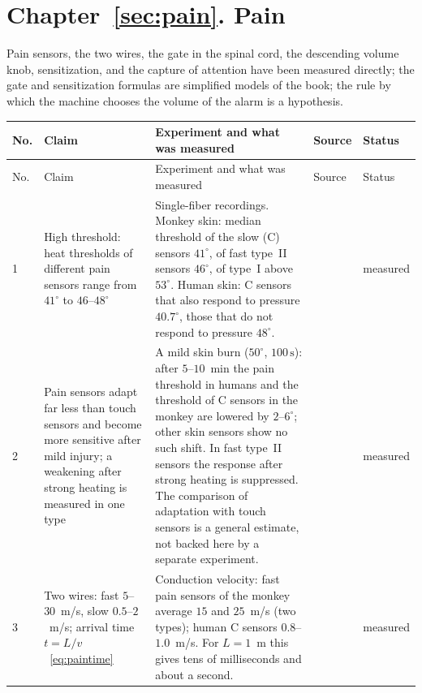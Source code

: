 \section{Chapter~\ref{sec:pain}. Pain}

Pain sensors, the two wires, the gate in the spinal cord, the descending volume knob, sensitization, and the capture of attention have been measured directly; the gate and sensitization formulas are simplified models of the book; the rule by which the machine chooses the volume of the alarm is a hypothesis.

{\footnotesize
\setlength{\tabcolsep}{3pt}\renewcommand{\arraystretch}{1.15}
\begin{longtable}{>{\raggedright}p{0.5cm}>{\raggedright}p{4.0cm}>{\raggedright}p{5.6cm}>{\raggedright}p{2.3cm}>{\raggedright\arraybackslash}p{1.7cm}}
\toprule
No. & Claim & Experiment and what was measured & Source & Status \\
\midrule\endfirsthead
\toprule
No. & Claim & Experiment and what was measured & Source & Status \\
\midrule\endhead
1 & High threshold: heat thresholds of different pain sensors range from $41^\circ$ to $46$--$48^\circ$ & Single-fiber recordings. Monkey skin: median threshold of the slow (C) sensors $41^\circ$, of fast type~II sensors $46^\circ$, of type~I above $53^\circ$. Human skin: C sensors that also respond to pressure $40.7^\circ$, those that do not respond to pressure $48^\circ$. & \cite{Treede1995heat, Weidner1999cfib} & measured \\
2 & Pain sensors adapt far less than touch sensors and become more sensitive after mild injury; a weakening after strong heating is measured in one type & A mild skin burn ($50^\circ$, $100\,\text{s}$): after $5$--$10$~min the pain threshold in humans and the threshold of C sensors in the monkey are lowered by $2$--$6^\circ$; other skin sensors show no such shift. In fast type~II sensors the response after strong heating is suppressed. The comparison of adaptation with touch sensors is a general estimate, not backed here by a separate experiment. & \cite{LaMotte1982hyper, Treede1995heat} & measured \\
3 & Two wires: fast $5$--$30$~m/s, slow $0.5$--$2$~m/s; arrival time $t=L/v$~\eqref{eq:paintime} & Conduction velocity: fast pain sensors of the monkey average $15$ and $25$~m/s (two types); human C sensors $0.8$--$1.0$~m/s. For $L=1$~m this gives tens of milliseconds and about a second. & \cite{Treede1995heat, Weidner1999cfib} & measured \\

\end{longtable}}
